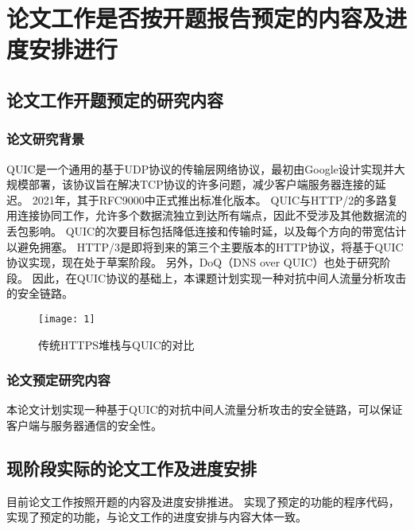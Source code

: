 \section{论文工作是否按开题报告预定的内容及进度安排进行}

\vspace{3mm}
\subsection{论文工作开题预定的研究内容}

\vspace{2mm}
\subsubsection{论文研究背景}
QUIC是一个通用的基于UDP协议的传输层网络协议，最初由Google设计实现并大规模部署\cite{langley2017quic}，该协议旨在解决TCP协议的许多问题，减少客户端服务器连接的延迟。
2021年，其于RFC9000\cite{rfc9000}中正式推出标准化版本。
QUIC与HTTP/2的多路复用连接协同工作，允许多个数据流独立到达所有端点，因此不受涉及其他数据流的丢包影响。
QUIC的次要目标包括降低连接和传输时延，以及每个方向的带宽估计以避免拥塞。
HTTP/3是即将到来的第三个主要版本的HTTP协议，将基于QUIC协议实现，现在处于草案阶段。
另外，DoQ（DNS over QUIC）也处于研究阶段。
因此，在QUIC协议的基础上，本课题计划实现一种对抗中间人流量分析攻击的安全链路。

\begin{figure}[h]
  \centering
  \texttt{[image: 1]}
  \caption{传统HTTPS堆栈与QUIC的对比}
  \label{fig:1}
\end{figure}

\vspace{2mm}
\subsubsection{论文预定研究内容}
本论文计划实现一种基于QUIC的对抗中间人流量分析攻击的安全链路，可以保证客户端与服务器通信的安全性。


\vspace{3mm}
\subsection{现阶段实际的论文工作及进度安排}
目前论文工作按照开题的内容及进度安排推进。
实现了预定的功能的程序代码，实现了预定的功能，与论文工作的进度安排与内容大体一致。 

